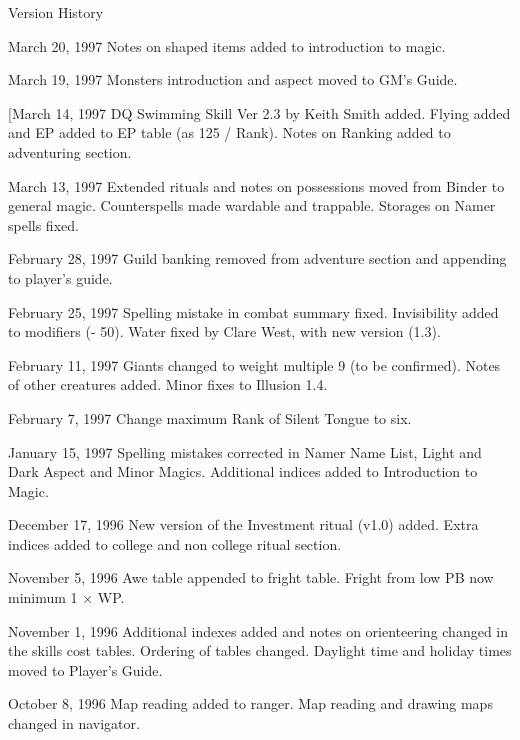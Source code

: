 \begin{Chapter}{Version History}
\begin{Description}
\item[March 20, 1997] Notes on shaped items added to introduction to
  magic.

\item[March 19, 1997] Monsters introduction and aspect moved to GM’s
  Guide.

\item[[March 14, 1997] DQ Swimming Skill Ver 2.3 by Keith Smith
  added. Flying added and EP added to EP table (as 125 / Rank). Notes
  on Ranking added to adventuring section.

\item[March 13, 1997] Extended rituals and notes on possessions moved
  from Binder to general magic.  Counterspells made wardable and
  trappable.  Storages on Namer spells fixed.

\item[February 28, 1997] Guild banking removed from adventure section
  and appending to player’s guide.

\item[February 25, 1997] Spelling mistake in combat summary fixed.
  Invisibility added to modifiers (- 50). Water fixed by Clare West,
  with new version (1.3).

\item[February 11, 1997] Giants changed to weight multiple 9 (to be
  confirmed).  Notes of other creatures added. Minor fixes to Illusion
  1.4.

\item[February 7, 1997] Change maximum Rank of Silent Tongue to six.

\item[January 15, 1997] Spelling mistakes corrected in Namer Name
  List, Light and Dark Aspect and Minor Magics.  Additional indices
  added to Introduction to Magic.

\item[December 17, 1996] New version of the Investment ritual (v1.0)
  added.  Extra indices added to college and non college ritual
  section.

\item[November 5, 1996] Awe table appended to fright table. Fright
  from low PB now minimum 1 × WP.

\item[November 1, 1996] Additional indexes added and notes on
  orienteering changed in the skills cost tables.  Ordering of tables
  changed.  Daylight time and holiday times moved to Player’s Guide.

\item[October 8, 1996] Map reading added to ranger. Map reading and
  drawing maps changed in navigator.


\end{Description}
\end{Chapter}
